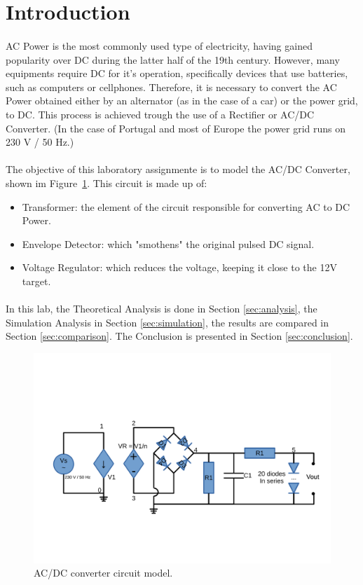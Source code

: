 \section{Introduction}
\label{sec:introduction}


\paragraph{} AC Power is the most commonly used type of electricity, having gained popularity over DC during the latter half of the 19th century. However, many equipments require DC for it's operation, 
specifically devices that use batteries, such as computers or cellphones. Therefore, it is necessary to convert the AC Power obtained either by an alternator (as in the case of a car) or the power grid, to DC.
This process is achieved trough the use of a Rectifier or AC/DC Converter. (In the case of Portugal and most of Europe the power grid runs on 230 V / 50 Hz.)

\paragraph{} The objective of this laboratory assignmente is to model the AC/DC Converter, shown im Figure~\ref{fig:cir}. This circuit is made up of:

\begin{itemize}
	\item Transformer: the element of the circuit responsible for converting AC to DC Power.
	\item Envelope Detector: which "smothens" the original pulsed DC signal.
	\item Voltage Regulator: which reduces the voltage, keeping it close to the 12V target.
\end{itemize}

\paragraph{} In this lab, the Theoretical Analysis is done in Section \ref{sec:analysis}, the Simulation Analysis in Section \ref{sec:simulation}, the results are compared in Section \ref{sec:comparison}. The
Conclusion is presented in Section \ref{sec:conclusion}.

\begin{figure}[h] \centering
\includegraphics[width=0.4\linewidth]{./cir.pdf}
\caption{AC/DC converter circuit model.}
\label{fig:cir}
\end{figure}

